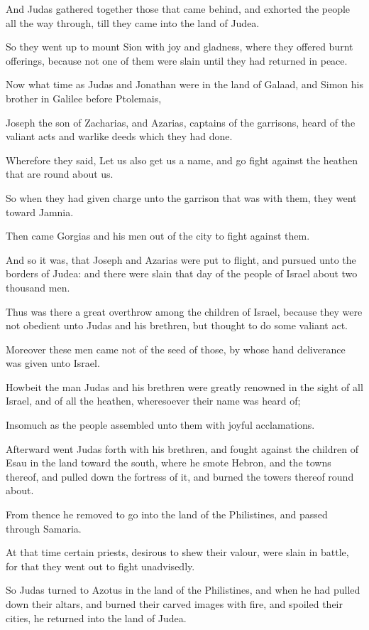 {\par }{\PP {}And Judas gathered together those that came behind, and exhorted the people all the way through, till they came into the land of Judea.
\par }{\PP {}So they went up to mount Sion with joy and gladness, where they offered burnt offerings, because not one of them were slain until they had returned in peace.
\par }{\PP {}Now what time as Judas and Jonathan were in the land of Galaad, and Simon his brother in Galilee before Ptolemais,
\par }{\PP {}Joseph the son of Zacharias, and Azarias, captains of the garrisons, heard of the valiant acts and warlike deeds which they had done.
\par }{\PP {}Wherefore they said, Let us also get us a name, and go fight against the heathen that are round about us.
\par }{\PP {}So when they had given charge unto the garrison that was with them, they went toward Jamnia.
\par }{\PP {}Then came Gorgias and his men out of the city to fight against them.
\par }{\PP {}And so it was, that Joseph and Azarias were put to flight, and pursued unto the borders of Judea: and there were slain that day of the people of Israel about two thousand men.
\par }{\PP {}Thus was there a great overthrow among the children of Israel, because they were not obedient unto Judas and his brethren, but thought to do some valiant act.
\par }{\PP {}Moreover these men came not of the seed of those, by whose hand deliverance was given unto Israel.
\par }{\PP {}Howbeit the man Judas and his brethren were greatly renowned in the sight of all Israel, and of all the heathen, wheresoever their name was heard of;
\par }{\PP {}Insomuch as the people assembled unto them with joyful acclamations.
\par }{\PP {}Afterward went Judas forth with his brethren, and fought against the children of Esau in the land toward the south, where he smote Hebron, and the towns thereof, and pulled down the fortress of it, and burned the towers thereof round about.
\par }{\PP {}From thence he removed to go into the land of the Philistines, and passed through Samaria.
\par }{\PP {}At that time certain priests, desirous to shew their valour, were slain in battle, for that they went out to fight unadvisedly.
\par }{\PP {}So Judas turned to Azotus in the land of the Philistines, and when he had pulled down their altars, and burned their carved images with fire, and spoiled their cities, he returned into the land of Judea.

}
